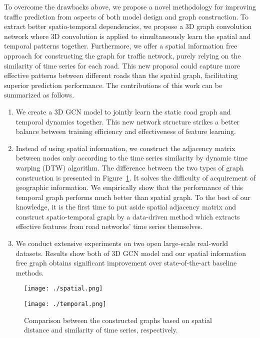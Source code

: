 \documentclass{article}
\begin{document}
To overcome the drawbacks above, we propose a novel methodology for improving traffic prediction from aspects of both model design and graph construction. To  extract  better spatio-temporal dependencies, we propose a 3D graph convolution network  where 3D convolution is applied to simultaneously learn the spatial and temporal patterns together. Furthermore, we offer a spatial information free approach for constructing the graph for traffic network, purely relying on the similarity of time series for each road. This new proposal could capture more effective patterns between different roads than the spatial graph, facilitating superior prediction performance.   
The contributions of this work can be summarized as follows.  
\begin{enumerate}
\item We create a 3D GCN model to jointly learn the static road graph and temporal dynamics together. This new network structure strikes a better balance between training efficiency and effectiveness of feature learning.
\item Instead of using spatial information, we construct the adjacency matrix between nodes only according to the time series similarity  by dynamic time warping (DTW) algorithm. The difference between the two types of graph construction is presented in Figure~\ref{fig:stg}. It solves the difficulty of acquirement of geographic information. We empirically show that the performance of this temporal graph performs much better than spatial graph. 
 To the best of our knowledge, it is the first time to put aside spatial adjacency matrix and construct spatio-temporal graph by a data-driven method which extracts effective features from road networks' time series themselves.
\item We conduct extensive experiments on two open large-scale real-world datasets. Results show both of 3D GCN model and our spatial information free graph obtains significant improvement over state-of-the-art baseline methods.
\end{enumerate}

\begin{figure}
	\begin{minipage}[t]{0.5\linewidth}
		\centering
		\texttt{[image: ./spatial.png]}
	\end{minipage}\begin{minipage}[t]{0.5\linewidth}
		\centering
		\texttt{[image: ./temporal.png]}
	\end{minipage}
	\caption{\label{fig:stg} Comparison between the constructed graphs based on spatial distance and similarity of time series, respectively.}
\end{figure}
\end{document}

